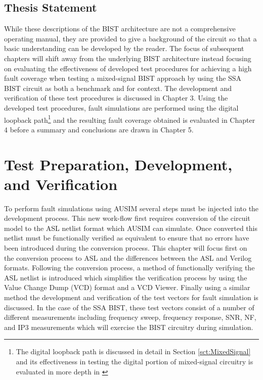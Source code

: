 \documentclass[12pt]{report}
\begin{document}
\section{Thesis Statement}
While these descriptions of the BIST architecture are not a comprehensive operating manual, they are provided to give a background of the circuit so that a basic understanding can be developed by the reader.  The focus of subsequent chapters will shift away from the underlying BIST architecture instead focusing on evaluating the effectiveness of developed test procedures for achieving a high fault coverage when testing a mixed-signal BIST approach by using the SSA BIST circuit as both a benchmark and for context.  The development and verification of these test procedures is discussed in Chapter 3.  Using the developed test procedures, fault simulations are performed using the digital loopback path\footnote{The digital loopback path is discussed in detail in Section \ref{sct:MixedSignal} and its effectiveness in testing the digital portion of mixed-signal circuitry is evaluated in more depth in \cite{stroud-analog}} and the resulting fault coverage obtained is evaluated in Chapter 4 before a summary and conclusions are drawn in Chapter 5. 

\chapter{Test Preparation, Development, and Verification}
To perform fault simulations using AUSIM several steps must be injected into the development process.  This new work-flow first requires conversion of the circuit model to the ASL netlist format which AUSIM can simulate.  Once converted this netlist must be functionally verified as equivalent to ensure that no errors have been introduced during the conversion process.  This chapter will focus first on the conversion process to ASL and the differences between the ASL and Verilog formats.  Following the conversion process, a method of functionally verifying the ASL netlist is introduced which simplifies the verification process by using the Value Change Dump (VCD) format and a VCD Viewer.  Finally using a similar method the development and verification of the test vectors for fault simulation is discussed.  In the case of the SSA BIST, these test vectors consist of a number of different measurements including frequency sweep, frequency response, SNR, NF, and IP3 measurements which will exercise the BIST circuitry during simulation.
\end{document}
